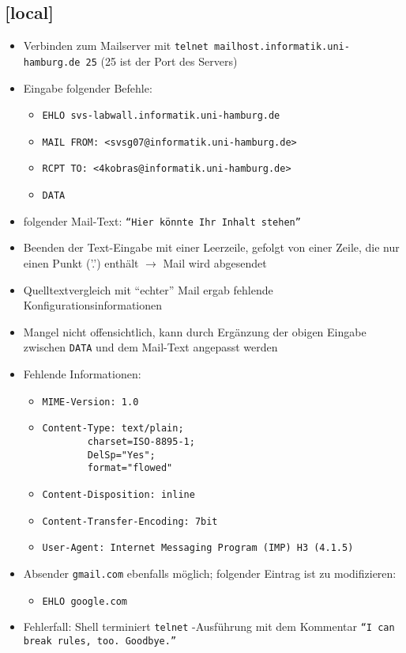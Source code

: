 \documentclass[twoside]{article}
\newcommand{\ttt}[1]{%
	\texttt{#1}%
}
\begin{document}
\subsection{[local]}
\begin{itemize}
	\item Verbinden zum Mailserver mit \ttt{telnet mailhost.informatik.uni-hamburg.de 25} (25 ist der Port des Servers)
	\item Eingabe folgender Befehle:
	\begin{itemize}
		\item \ttt{EHLO svs-labwall.informatik.uni-hamburg.de}
		\item \ttt{MAIL FROM: <svsg07@informatik.uni-hamburg.de>}
		\item \ttt{RCPT TO: <4kobras@informatik.uni-hamburg.de>}
		\item \ttt{DATA}
	\end{itemize}
	\item folgender Mail-Text: \ttt{``Hier könnte Ihr Inhalt stehen''}
	\item Beenden der Text-Eingabe mit einer Leerzeile, gefolgt von einer Zeile, die nur einen Punkt ('.') enthält $\rightarrow$ Mail wird abgesendet
	\item Quelltextvergleich mit ``echter'' Mail ergab fehlende Konfigurationsinformationen
	\item Mangel nicht offensichtlich, kann durch Ergänzung der obigen Eingabe zwischen \ttt{DATA} und dem Mail-Text angepasst werden
	\item Fehlende Informationen:
	\begin{itemize}
		\item \ttt{MIME-Version: 1.0}
		\item \ttt{Content-Type: text/plain;\\
				\-~~~~~~~~charset=ISO-8895-1;\\
				\-~~~~~~~~DelSp="Yes";\\
				\-~~~~~~~~format="flowed"}
		\item \ttt{Content-Disposition: inline}
		\item \ttt{Content-Transfer-Encoding: 7bit}
		\item \ttt{User-Agent: Internet Messaging Program (IMP) H3 (4.1.5)}
	\end{itemize}
	\item Absender \ttt{gmail.com} ebenfalls möglich; folgender Eintrag ist zu modifizieren:
	\begin{itemize}
		\item \ttt{EHLO google.com}
	\end{itemize}
	\item Fehlerfall: Shell terminiert \ttt{telnet}-Ausführung mit dem Kommentar \ttt{``I can break rules, too. Goodbye.''}
\end{itemize}
\end{document}
